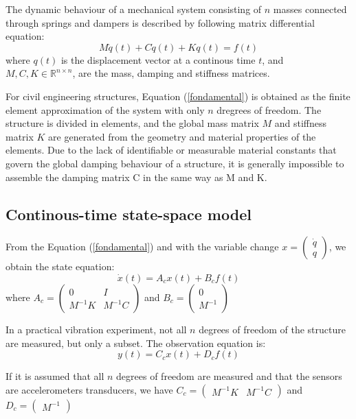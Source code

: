 \documentclass[journal]{IEEEtran}
\begin{document}
The dynamic behaviour of a mechanical system consisting of $n$ masses connected
through springs and dampers is described by following matrix differential equation:
\begin{equation}
M \ddot{q}(t) + C \dot{q}(t) + K q(t) = f(t)
\label{fondamental}
\end{equation}
where $q(t)$ is the displacement vector at a continous time $t$, and $M, C, K \in \mathbb{R}^{n \times n}$, are the mass, damping and stiffness matrices. 

For civil engineering structures, Equation (\ref{fondamental}) is obtained as the finite element approximation of the system with only $n$ dregrees of freedom.
The structure is divided in elements, and the global mass matrix $M$ and stiffness matrix $K$ are generated from the geometry and material
properties of the elements.
Due to the lack of identifiable or measurable material
constants that govern the global damping behaviour of a structure, it is generally
impossible to assemble the damping matrix C in the same way as M and K.


\subsection{Continous-time state-space model} %

From the Equation (\ref{fondamental}) and with the variable change $x =
\begin{pmatrix}
\dot{q} \\
q
\end{pmatrix}$, we obtain the state equation:
\begin{equation}
\dot{x}(t) = A_cx(t) + B_cf(t)
\end{equation}
 where
$A_c =
\begin{pmatrix}
0 & I \\
M^{-1}K & M^{-1}C
\end{pmatrix}$
and
$B_c=
\begin{pmatrix}
0 \\
M^{-1}
\end{pmatrix}$

In a practical vibration experiment, not all $n$ degrees of freedom of the structure are measured, but only
a subset. The observation equation is:
\begin{equation}
y(t) = C_cx(t) + D_cf(t)
\end{equation}

If it is assumed that all $n$ degrees of freedom are measured and that the sensors are accelerometers transducers, we have
$C_c =
\begin{pmatrix}
M^{-1}K & M^{-1}C
\end{pmatrix}$
and
$D_c=
\begin{pmatrix}
M^{-1}
\end{pmatrix}$
\end{document}
